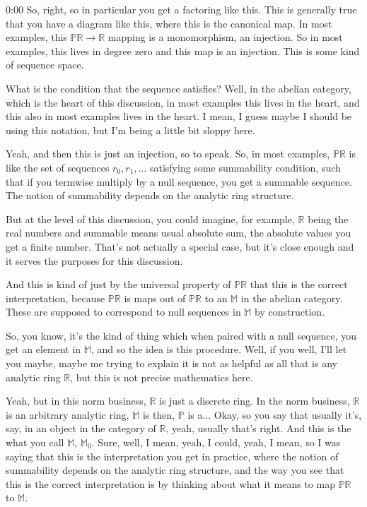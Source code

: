 \begin{unfinished}{0:00}
So, right, so in particular you get a factoring like this. This is generally true that you have a diagram like this, where this is the canonical map. In most examples, this $\mathbb{PR} \to \mathbb{R}$ mapping is a monomorphism, an injection. So in most examples, this lives in degree zero and this map is an injection. This is some kind of sequence space.

What is the condition that the sequence satisfies? Well, in the abelian category, which is the heart of this discussion, in most examples this lives in the heart, and this also in most examples lives in the heart. I mean, I guess maybe I should be using this notation, but I'm being a little bit sloppy here.

Yeah, and then this is just an injection, so to speak. So, in most examples, $\mathbb{PR}$ is like the set of sequences $r_0, r_1, \dots$ satisfying some summability condition, such that if you termwise multiply by a null sequence, you get a summable sequence. The notion of summability depends on the analytic ring structure.

But at the level of this discussion, you could imagine, for example, $\mathbb{R}$ being the real numbers and summable means usual absolute sum, the absolute values you get a finite number. That's not actually a special case, but it's close enough and it serves the purposes for this discussion.

And this is kind of just by the universal property of $\mathbb{PR}$ that this is the correct interpretation, because $\mathbb{PR}$ is maps out of $\mathbb{PR}$ to an $\mathbb{M}$ in the abelian category. These are supposed to correspond to null sequences in $\mathbb{M}$ by construction.

So, you know, it's the kind of thing which when paired with a null sequence, you get an element in $\mathbb{M}$, and so the idea is this procedure. Well, if you well, I'll let you maybe, maybe me trying to explain it is not as helpful as all that is any analytic ring $\mathbb{R}$, but this is not precise mathematics here.

Yeah, but in this norm business, $\mathbb{R}$ is just a discrete ring. In the norm business, $\mathbb{R}$ is an arbitrary analytic ring, $\mathbb{M}$ is then, $\mathbb{P}$ is a... Okay, so you say that usually it's, say, in an object in the category of $\mathbb{R}$, yeah, usually that's right. And this is the what you call $\mathbb{M}$, $\mathbb{M}_0$. Sure, well, I mean, yeah, I could, yeah, I mean, so I was saying that this is the interpretation you get in practice, where the notion of summability depends on the analytic ring structure, and the way you see that this is the correct interpretation is by thinking about what it means to map $\mathbb{PR}$ to $\mathbb{M}$.


\end{unfinished}
